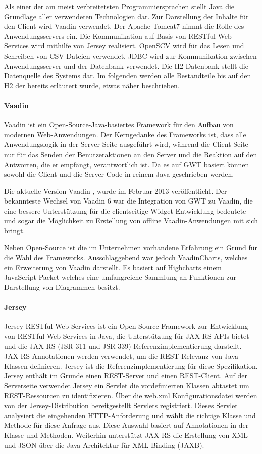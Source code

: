Als einer der am meist verbreitetsten Programmiersprachen stellt Java die Grundlage aller verwendeten Technologien dar. Zur Darstellung der Inhalte für den Client wird Vaadin verwendet. Der Apache Tomcat7 nimmt die Rolle des Anwendungsservers ein. Die Kommunikation auf Basis von RESTful Web Services wird mithilfe von Jersey realisiert. OpenSCV wird für das Lesen und Schreiben von CSV-Dateien verwendet. JDBC wird zur Kommunikation zwischen Anwendungsserver und der Datenbank verwendet. Die H2-Datenbank stellt die Datenquelle des Systems dar. Im folgenden werden alle Bestandteile bis auf den H2 der bereits erläutert wurde, etwas näher beschrieben. 

\paragraph{Vaadin}

Vaadin ist ein Open-Source-Java-basiertes Framework für den Aufbau von modernen Web-Anwendungen. Der Kerngedanke des Frameworks ist, dass alle Anwendungslogik in der Server-Seite ausgeführt wird, während die Client-Seite nur für das Senden der Benutzeraktionen an den Server und die Reaktion auf den Antworten, die er empfängt, verantwortlich ist. Da es auf GWT basiert können sowohl die Client-und die Server-Code in reinem Java geschrieben werden.

Die aktuelle Version Vaadin , wurde im Februar 2013 veröffentlicht. Der bekannteste Wechsel von Vaadin 6 war die Integration von GWT zu Vaadin, die eine bessere Unterstützung für die clientseitige Widget Entwicklung bedeutete und sogar die Möglichkeit zu Erstellung von offline Vaadin-Anwendungen mit sich bringt.

Neben Open-Source ist die im Unternehmen vorhandene Erfahrung ein Grund für die Wahl des Frameworks. Ausschlaggebend war jedoch VaadinCharts, welches ein Erweiterung von Vaadin darstellt. Es basiert auf Highcharts einem JavaScript-Packet welches eine umfangreiche Sammlung an Funktionen zur Darstellung von Diagrammen besitzt. 

\paragraph{Jersey}

Jersey RESTful Web Services ist ein Open-Source-Framework zur Entwicklung von RESTful Web Services in Java, die Unterstützung für JAX-RS-APIs bietet und die JAX-RS (JSR 311 und JSR 339)-Referenzimplementierung darstellt. JAX-RS-Annotationen werden verwendet, um die REST Relevanz von Java-Klassen definieren. Jersey ist die Referenzimplementierung für diese Spezifikation. Jersey enthält im Grunde einen REST-Server und einen REST-Client. Auf der Serverseite verwendet Jersey ein Servlet die vordefinierten Klassen abtastet um REST-Ressourcen zu identifizieren. Über die web.xml Konfigurationsdatei werden von der Jersey-Distribution bereitgestellt Servlets registriert. Dieses Servlet analysiert die eingehenden HTTP-Anforderung und wählt die richtige Klasse und Methode für diese Anfrage aus. Diese Auswahl basiert auf Annotationen in der Klasse und Methoden. Weiterhin unterstützt JAX-RS die Erstellung von XML-und JSON über die Java Architektur für XML Binding (JAXB).

